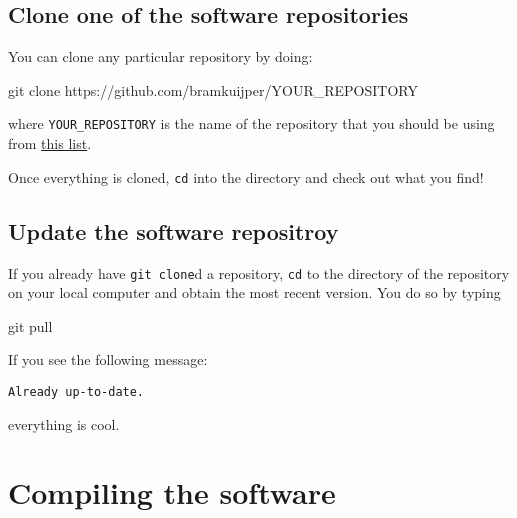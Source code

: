 \documentclass[
]{book}
\newenvironment{Shaded}{\begin{snugshade}}{\end{snugshade}}
\newcommand{\FunctionTok}[1]{\textcolor[rgb]{0.00,0.00,0.00}{#1}}
\newcommand{\NormalTok}[1]{#1}
\begin{document}
\hypertarget{clone-one-of-the-software-repositories}{%
\subsection{Clone one of the software repositories}\label{clone-one-of-the-software-repositories}}

You can clone any particular repository by doing:

\begin{Shaded}
\begin{Highlighting}[]
\FunctionTok{git}\NormalTok{ clone https://github.com/bramkuijper/YOUR\_REPOSITORY}
\end{Highlighting}
\end{Shaded}

where \texttt{YOUR\_REPOSITORY} is the name of the repository that you should be using from \href{https://github.com/bramkuijper?tab=repositories}{this list}.

Once everything is cloned, \texttt{cd} into the directory and check out what you find!

\hypertarget{update-the-software-repositroy}{%
\subsection{Update the software repositroy}\label{update-the-software-repositroy}}

If you already have \texttt{git\ clone}d a repository, \texttt{cd} to the directory of the repository on your local computer and obtain the most recent version. You do so by typing

\begin{Shaded}
\begin{Highlighting}[]
\FunctionTok{git}\NormalTok{ pull}
\end{Highlighting}
\end{Shaded}

If you see the following message:

\begin{verbatim}
Already up-to-date.
\end{verbatim}

everything is cool.

\hypertarget{compiling-the-software}{%
\section{Compiling the software}\label{compiling-the-software}}
\end{document}
